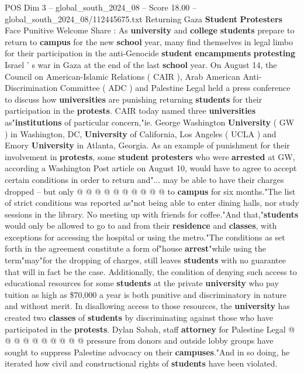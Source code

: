 \begin{textsample}{POS Dim 3 – global\_south\_2024\_08 – Score 18.00 – global\_south\_2024\_08/112445675.txt}  \label{ex:f3_pos_301}
Returning Gaza \textbf{Student} \textbf{Protesters} Face Punitive Welcome Share : As \textbf{university} and \textbf{college} \textbf{students} prepare to return to \textbf{campus} for the new \textbf{school} year, many find themselves in legal limbo for their participation in the anti-Genocide \textbf{student} \textbf{encampments} \textbf{protesting} Israel ' s war in Gaza at the end of the last \textbf{school} year.
On August 14, the Council on American-Islamic Relations ( CAIR ), Arab American Anti-Discrimination Committee ( ADC ) and Palestine Legal held a press conference to discuss how \textbf{universities} are punishing returning \textbf{students} for their participation in the \textbf{protests}.
CAIR today named three \textbf{universities} as"\textbf{institutions} of particular concern,"ie.
George Washington \textbf{University} ( GW ) in Washington, DC, \textbf{University} of California, Los Angeles ( UCLA ) and Emory \textbf{University} in Atlanta, Georgia.
As an example of punishment for their involvement in \textbf{protests}, some \textbf{student} \textbf{protesters} who were \textbf{arrested} at GW, according a Washington Post article on August 10, would have to agree to accept certain conditions in order to return and"... may be able to have their charges dropped -- but only @ @ @ @ @ @ @ @ @ @ to \textbf{campus} for six months."The list of strict conditions was reported as"not being able to enter dining halls, nor study sessions in the library.
No meeting up with friends for coffee."And that,"\textbf{students} would only be allowed to go to and from their \textbf{residence} and \textbf{classes}, with exceptions for accessing the hospital or using the metro."The conditions as set forth in the agreement constitute a form of"house \textbf{arrest}"while using the term"may"for the dropping of charges, still leaves \textbf{students} with no guarantee that will in fact be the case.
Additionally, the condition of denying such access to educational resources for some \textbf{students} at the private \textbf{university} who pay tuition as high as \$70,000 a year is both punitive and discriminatory in nature and without merit.
In disallowing access to those resources, the \textbf{university} has created two \textbf{classes} of \textbf{students} by discriminating against those who have participated in the \textbf{protests}.
Dylan Sabah, staff \textbf{attorney} for Palestine Legal @ @ @ @ @ @ @ @ @ @ pressure from donors and outside lobby groups have sought to suppress Palestine advocacy on their \textbf{campuses}."And in so doing, he iterated how civil and constructional rights of \textbf{students} have been violated.

\end{textsample}

